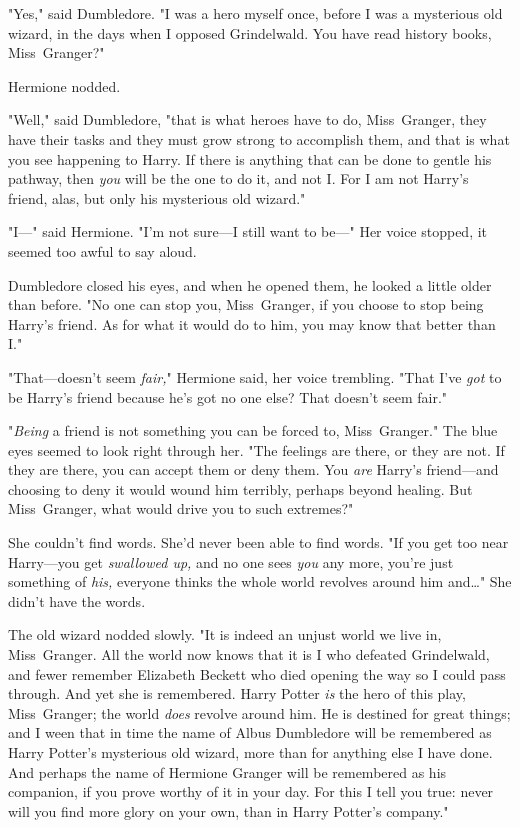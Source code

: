 "Yes," said Dumbledore. "I was a hero myself once, before I was a mysterious
old wizard, in the days when I opposed Grindelwald. You have read history
books, Miss~Granger?"

Hermione nodded.

"Well," said Dumbledore, "that is what heroes have to do, Miss~Granger, they
have their tasks and they must grow strong to accomplish them, and that is what
you see happening to Harry. If there is anything that can be done to gentle his
pathway, then \emph{you} will be the one to do it, and not I\@. For I am not
Harry's friend, alas, but only his mysterious old wizard."

"I---" said Hermione. "I'm not sure---I still want to be---" Her voice stopped,
it seemed too awful to say aloud.

Dumbledore closed his eyes, and when he opened them, he looked a little older
than before. "No one can stop you, Miss~Granger, if you choose to stop being
Harry's friend. As for what it would do to him, you may know that better than
I."

"That---doesn't seem \emph{fair,}" Hermione said, her voice trembling. "That
I've \emph{got} to be Harry's friend because he's got no one else? That doesn't
seem fair."

"\emph{Being} a friend is not something you can be forced to, Miss~Granger."
The blue eyes seemed to look right through her. "The feelings are there, or
they are not. If they are there, you can accept them or deny them. You
\emph{are} Harry's friend---and choosing to deny it would wound him terribly,
perhaps beyond healing. But Miss~Granger, what would drive you to such
extremes?"

She couldn't find words. She'd never been able to find words. "If you get too
near Harry---you get \emph{swallowed up,} and no one sees \emph{you} any more,
you're just something of \emph{his,} everyone thinks the whole world revolves
around him and…" She didn't have the words.

The old wizard nodded slowly. "It is indeed an unjust world we live in,
Miss~Granger. All the world now knows that it is I who defeated Grindelwald, and
fewer remember Elizabeth Beckett who died opening the way so I could pass
through. And yet she is remembered. Harry Potter \emph{is} the hero of this
play, Miss~Granger; the world \emph{does} revolve around him. He is destined
for great things; and I ween that in time the name of Albus Dumbledore will be
remembered as Harry Potter's mysterious old wizard, more than for anything else
I have done. And perhaps the name of Hermione Granger will be remembered as his
companion, if you prove worthy of it in your day. For this I tell you true:
never will you find more glory on your own, than in Harry Potter's company."


